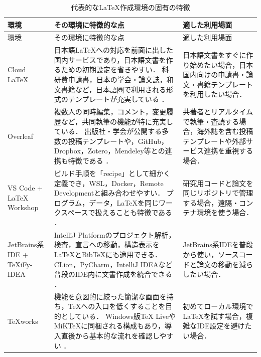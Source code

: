\documentclass[a4paper,11pt]{jsarticle}
\begin{document}
\begin{longtable}{|>{\raggedright\arraybackslash}p{34mm}
                  |>{\raggedright\arraybackslash}p{70mm}
                  |>{\raggedright\arraybackslash}p{43mm}|}
  \caption{代表的なLaTeX作成環境の固有の特徴}
  \label{tab:authoring-environments}\\
  \hline
  環境 & その環境に特徴的な点 & 適した利用場面 \\
  \hline
  \endfirsthead
  \hline
  環境 & その環境に特徴的な点 & 適した利用場面 \\
  \hline
  \endhead

  Cloud LaTeX
  & 日本語LaTeXへの対応を前面に出した国内サービスであり，日本語文書を作るための初期設定を省きやすい．
    科研費申請書，日本の学会・論文誌，和文書籍など，日本語圏で利用される形式のテンプレートが充実している
    \cite{cloudlatex-features}．
  & 日本語文書をすぐに作り始めたい場合，日本国内向けの申請書・論文・書籍テンプレートを利用したい場合． \\
  \hline

  Overleaf
  & 複数人の同時編集，コメント，変更履歴など，共同執筆の機能が特に充実している．
    出版社・学会が公開する多数の投稿テンプレートや，GitHub，Dropbox，Zotero，Mendeley等との連携も特徴である
    \cite{overleaf-features,overleaf-collaboration}．
  & 共著者とリアルタイムで執筆・査読する場合，海外誌を含む投稿テンプレートや外部サービス連携を重視する場合． \\
  \hline

  VS Code + LaTeX Workshop
  & ビルド手順を「recipe」として細かく定義でき，WSL，Docker，Remote Developmentと組み合わせやすい．
    プログラム，データ，LaTeXを同じワークスペースで扱えることも特徴である
    \cite{latex-workshop}．
  & 研究用コードと論文を同じリポジトリで管理する場合，遠隔・コンテナ環境を使う場合． \\
  \hline

  JetBrains系IDE + TeXiFy-IDEA
  & IntelliJ Platformのプロジェクト解析，検査，宣言への移動，構造表示をLaTeXとBibTeXにも適用できる．
    CLion，PyCharm，IntelliJ IDEAなど普段のIDE内に文書作成を統合できる
    \cite{texify-idea}．
  & JetBrains系IDEを普段から使い，ソースコードと論文の移動を減らしたい場合． \\
  \hline

  TeXworks
  & 機能を意図的に絞った簡潔な画面を持ち，TeXへの入口を低くすることを目的としている．
    Windows版TeX LiveやMiKTeXに同梱される構成もあり，導入直後から基本的な流れを確認しやすい
    \cite{texworks}．
  & 初めてローカル環境でLaTeXを試す場合，複雑なIDE設定を避けたい場合． \\
  \hline


\end{longtable}
\end{document}
